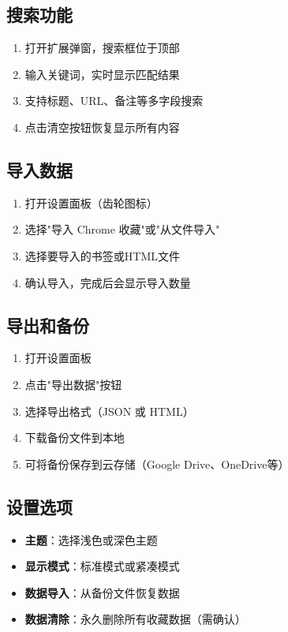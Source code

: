 \documentclass[10pt,a4paper]{article}
\begin{document}
\subsection{搜索功能}
\begin{enumerate}
  \item 打开扩展弹窗，搜索框位于顶部
  \item 输入关键词，实时显示匹配结果
  \item 支持标题、URL、备注等多字段搜索
  \item 点击清空按钮恢复显示所有内容
\end{enumerate}

\subsection{导入数据}
\begin{enumerate}
  \item 打开设置面板（齿轮图标）
  \item 选择"导入 Chrome 收藏"或"从文件导入"
  \item 选择要导入的书签或HTML文件
  \item 确认导入，完成后会显示导入数量
\end{enumerate}

\subsection{导出和备份}
\begin{enumerate}
  \item 打开设置面板
  \item 点击"导出数据"按钮
  \item 选择导出格式（JSON 或 HTML）
  \item 下载备份文件到本地
  \item 可将备份保存到云存储（Google Drive、OneDrive等）
\end{enumerate}

\subsection{设置选项}
\begin{itemize}
  \item \textbf{主题}：选择浅色或深色主题
  \item \textbf{显示模式}：标准模式或紧凑模式
  \item \textbf{数据导入}：从备份文件恢复数据
  \item \textbf{数据清除}：永久删除所有收藏数据（需确认）
\end{itemize}
\end{document}
